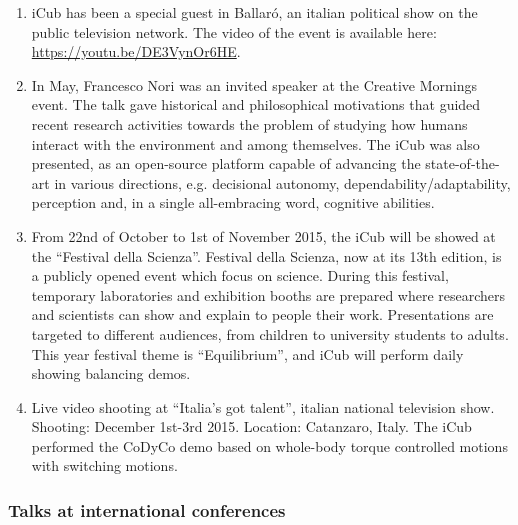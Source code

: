\begin{enumerate}

\item iCub has been a special guest in Ballar\'o, an italian political show on the public television network. The video of the event is available here: \url{https://youtu.be/DE3VynOr6HE}.

\item In May, Francesco Nori was an invited speaker at the Creative Mornings event. The talk gave historical and philosophical motivations that guided recent research activities towards the problem of studying how humans interact with the environment and among themselves. The iCub was also presented, as an open-source platform capable of advancing the state-of-the-art in various directions, e.g. decisional autonomy, dependability/adaptability, perception and, in a single all-embracing word, cognitive abilities.

\item From 22nd of October to 1st of November 2015, the iCub will be showed at the ``Festival della Scienza''. Festival della Scienza, now at its 13th edition, is a publicly opened event which focus on science. During this festival, temporary laboratories and exhibition booths are prepared where researchers and scientists can show and explain to people their work. Presentations are targeted to different audiences, from children to university students to adults. This year festival theme is ``Equilibrium'', and iCub will perform daily showing balancing demos. 

\item Live video shooting at ``Italia's got talent'', italian national television show. Shooting: December 1st-3rd 2015. Location: Catanzaro, Italy. The iCub performed the CoDyCo demo based on whole-body torque controlled motions with switching motions.
\end{enumerate}

\subsubsection{Talks at international conferences}

